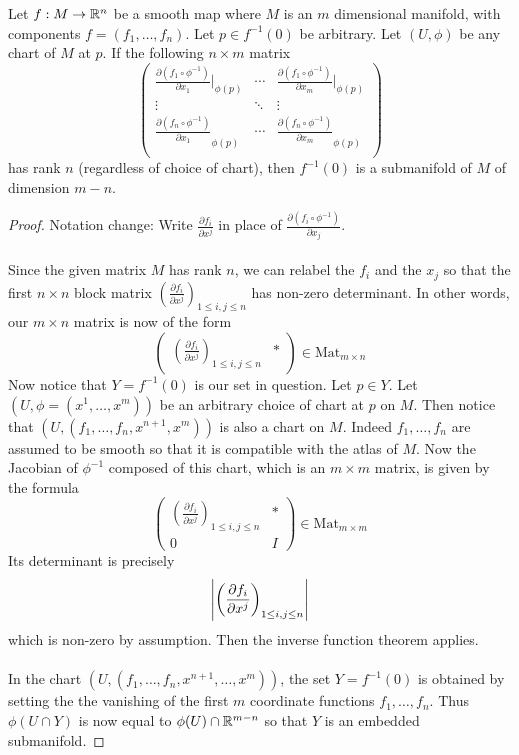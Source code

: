 \documentclass[a4paper]{article}
\begin{document}
\begin{thm}{}{} Let $f:M\to \mathbb{R}^n$ be a smooth map where $M$ is an $m$ dimensional manifold, with components $f=(f_1,\dots,f_n)$. Let $p\in f^{-1}(0)$ be arbitrary. Let $(U,\phi)$ be any chart of $M$ at $p$. If the following $n\times m$ matrix $$\begin{pmatrix}
\frac{\partial(f_1\circ\phi^{-1})}{\partial x_1}|_{\phi(p)} & \cdots & \frac{\partial(f_1\circ\phi^{-1})}{\partial x_m}|_{\phi(p)}\\
\vdots & \ddots & \vdots\\
\frac{\partial(f_n\circ\phi^{-1})}{\partial x_1}_{\phi(p)} & \cdots & \frac{\partial(f_n\circ\phi^{-1})}{\partial x_m}_{\phi(p)}\\
\end{pmatrix}$$
has rank $n$ (regardless of choice of chart), then $f^{-1}(0)$ is a submanifold of $M$ of dimension $m-n$. \tcbline
\begin{proof}
Notation change: Write $\frac{\partial f_i}{\partial x^j}$ in place of $\frac{\partial(f_i\circ\phi^{-1})}{\partial x_j}$. \\~\\
 
Since the given matrix $M$ has rank $n$, we can relabel the $f_i$ and the $x_j$ so that the first $n\times n$ block matrix $\left(\frac{\partial f_i}{\partial x^j}\right)_{1\leq i,j\leq n}$ has non-zero determinant. In other words, our $m\times n$ matrix is now of the form $$\begin{pmatrix}
\left(\frac{\partial f_i}{\partial x^j}\right)_{1\leq i,j\leq n} & \ast
\end{pmatrix}\in\text{Mat}_{m\times n}$$ Now notice that $Y=f^{-1}(0)$ is our set in question. Let $p\in Y$. Let $(U,\phi=(x^1,\dots,x^m))$ be an arbitrary choice of chart at $p$ on $M$. Then notice that $(U,(f_1,\dots,f_n,x^{n+1},x^m))$ is also a chart on $M$. Indeed $f_1,\dots,f_n$ are assumed to be smooth so that it is compatible with the atlas of $M$. Now the Jacobian of $\phi^{-1}$ composed of this chart, which is an $m\times m$ matrix, is given by the formula $$\begin{pmatrix}
\left(\frac{\partial f_i}{\partial x^j}\right)_{1\leq i,j\leq n} & \ast\\
0 & I
\end{pmatrix}\in\text{Mat}_{m\times m}$$ Its determinant is precisely $$\abs{\left(\frac{\partial f_i}{\partial x^j}\right)_{1\leq i,j\leq n}}$$ which is non-zero by assumption. Then the inverse function theorem applies. \\~\\

In the chart $(U,(f_1,\dots,f_n,x^{n+1},\dots,x^m))$, the set $Y=f^{-1}(0)$ is obtained by setting the the vanishing of the first $m$ coordinate functions $f_1,\dots,f_n$. Thus $\phi(U\cap Y)$ is now equal to $\phi(U)\cap\mathbb{R}^{m-n}$ so that $Y$ is an embedded submanifold. 
\end{proof}
\end{thm}
\end{document}
